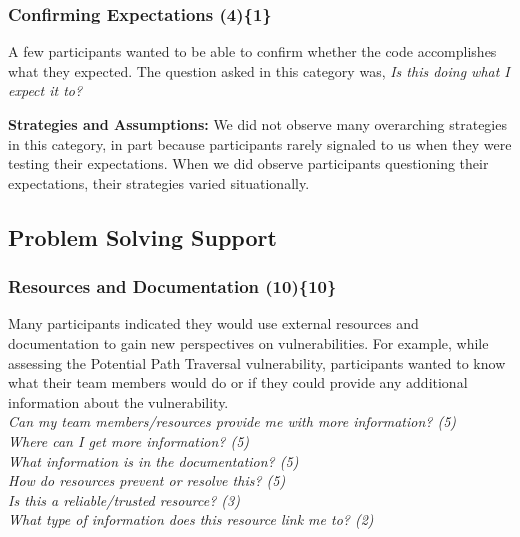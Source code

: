 \documentclass[10pt,journal,compsoc]{IEEEtran}
\begin{document}




\subsubsection{Confirming Expectations (4)\{1\}}

\label{ce}

A few participants wanted to be able to confirm whether the code accomplishes what they expected. 
The question asked in this category was, \textit{Is this doing what I expect it to?} 


\textbf{Strategies and Assumptions:}
We did not observe many overarching strategies in this category, in part because participants rarely signaled to us when they were testing their expectations. 
When we did observe participants questioning their expectations, their strategies varied situationally.


\subsection{Problem Solving Support}
\label{sec:results-pss}
\subsubsection{Resources and Documentation (10)\{10\}}

\label{rd}
Many participants indicated they would use external resources and documentation to gain new perspectives on vulnerabilities.
For example, while assessing the Potential Path Traversal vulnerability, participants wanted to know what their team members would do or if they could provide any additional information about the vulnerability. 
\\

\noindent\emph{Can my team members/resources provide me with more information? (5)} \\
\emph{Where can I get more information? (5)} \\
\emph{What information is in the documentation? (5)} \\
\emph{How do resources prevent or resolve this? (5)} \\
\emph{Is this a reliable/trusted resource? (3)} \\
\emph{What type of information does this resource link me to? (2)}
\\
 
\end{document}
